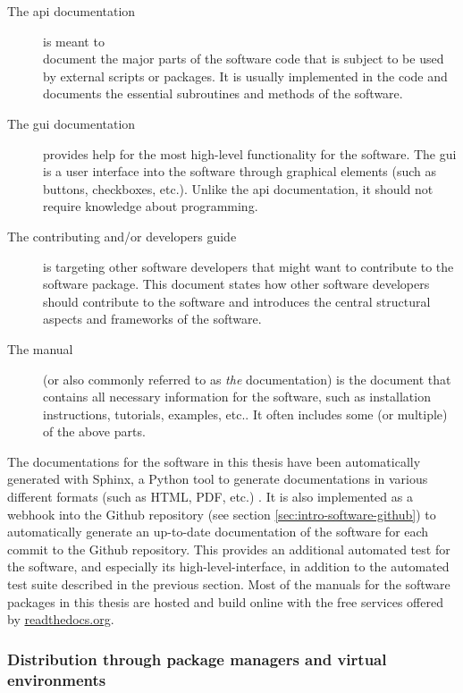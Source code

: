 \begin{refsection}
\begin{description}
	\item[The \gls{api} documentation] is meant to \\document the major parts of the software code that is subject to be used by external scripts or packages. It is usually implemented in the code and documents the essential subroutines and methods of the software.
	\item[The \gls{gui} documentation] provides help for the most high-level functionality for the software. The \gls{gui} is a user interface into the software through graphical elements (such as buttons, checkboxes, etc.). Unlike the \gls{api} documentation, it should not require knowledge about programming.
	\item[The contributing and/or developers guide] is targeting other software developers that might want to contribute to the software package. This document states how other software developers should contribute to the software and introduces the central structural aspects and frameworks of the software.
	\item[The manual] (or also commonly referred to as \textit{the} documentation) is the document that contains all necessary information for the software, such as installation instructions, tutorials, examples, etc.. It often includes some (or multiple) of the above parts.
\end{description}

The documentations for the software in this thesis have been automatically generated with Sphinx, a Python tool to generate documentations in various different formats (such as HTML, PDF, etc.)  \citep{PerezGrangerHunter2011, Hasecke2019}. It is also implemented as a webhook into the Github repository (see section \ref{sec:intro-software-github}) to automatically generate an up-to-date documentation of the software for each commit to the Github repository. This provides an additional automated test for the software, and especially its high-level-interface, in addition to the automated test suite described in the previous section. Most of the manuals for the software packages in this thesis are hosted and build online with the free services offered by \href{https://readthedocs.org/}{readthedocs.org}.


\subsubsection{Distribution through package managers and virtual environments} \label{sec:intro-software-conda}


\end{refsection}
